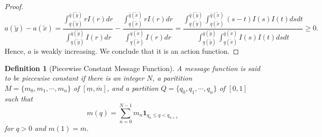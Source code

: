 \documentclass[12pt]{article}
\newtheorem{definition}{Definition}
\begin{document}
\begin{proof}
\begin{equation}
a(\tilde{y})-a(\tilde{x})=\frac{\int_{\underline{q}(\tilde{y})}^{\overline{q}(\tilde{y})}{rI(r)dr}}{\int_{\underline{q}(\tilde{y})}^{\overline{q}(\tilde{y})}{I(r)dr}}-\frac{\int_{\underline{q}(\tilde{x})}^{\overline{q}(\tilde{x})}{rI(r)dr}}{\int_{\underline{q}(\tilde{x})}^{\overline{q}(\tilde{x})}{I(r)dr}}=\frac{\int_{\underline{q}(\tilde{y})}^{\overline{q}(\tilde{y})}{\int_{\underline{q}(\tilde{x})}^{\overline{q}(\tilde{x})}{(s-t)I(s)I(t)dsdt}}}{\int_{\underline{q}(\tilde{y})}^{\overline{q}(\tilde{y})}{\int_{\underline{q}(\tilde{x})}^{\overline{q}(\tilde{x})}{I(s)I(t)dsdt}}}\geq0.
\end{equation}
Hence, $a$ is weakly increasing. We conclude that it is an action function.  
\end{proof}

\begin{definition}[Piecewise Constant Message Function]
A message function is said to be piecewise constant if there is an integer $N$, a paritition $M=\{m_{0},m_{1},\cdots,m_{n}\}$ of $[\underline{m},\overline{m}]$, and a partition $Q=\{q_{0},q_{1},\cdots,q_{n}\}$ of $[0,1]$ such that
\begin{equation}
m(q)=\sum_{n=0}^{N-1}{m_{n}\mathbf{1}_{q_{n}\leq q<q_{n+1}}}
\end{equation}
for $q>0$ and $m(1)=\overline{m}$.
\end{definition}
\end{document}
